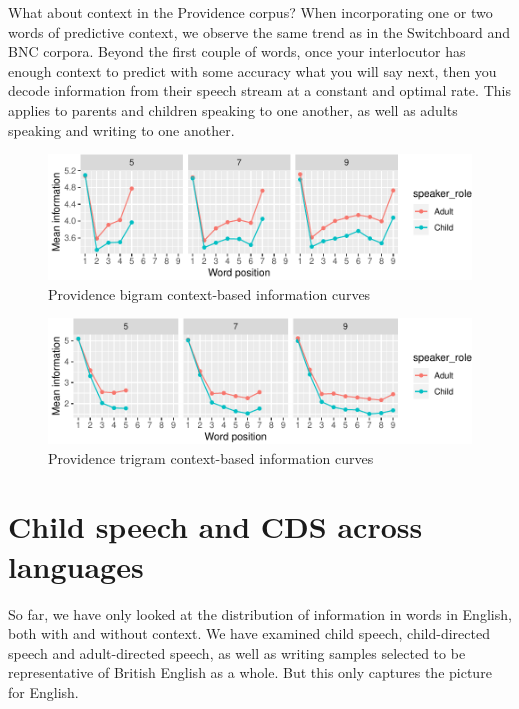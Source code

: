 \documentclass[11pt,]{article}
\begin{document}
What about context in the Providence corpus? When incorporating one or two words of predictive context, we observe the same trend as in the Switchboard and BNC corpora. Beyond the first couple of words, once your interlocutor has enough context to predict with some accuracy what you will say next, then you decode information from their speech stream at a constant and optimal rate. This applies to parents and children speaking to one another, as well as adults speaking and writing to one another.

\begin{figure}
\centering
\includegraphics{paper_files/figure-latex/unnamed-chunk-2-1.pdf}
\caption{\label{fig:unnamed-chunk-2}Providence bigram context-based information curves}
\end{figure}

\begin{figure}
\centering
\includegraphics{paper_files/figure-latex/unnamed-chunk-3-1.pdf}
\caption{\label{fig:unnamed-chunk-3}Providence trigram context-based information curves}
\end{figure}

\hypertarget{child-speech-and-cds-across-languages}{%
\section{Child speech and CDS across languages}\label{child-speech-and-cds-across-languages}}

So far, we have only looked at the distribution of information in words in English, both with and without context. We have examined child speech, child-directed speech and adult-directed speech, as well as writing samples selected to be representative of British English as a whole. But this only captures the picture for English.
\end{document}
